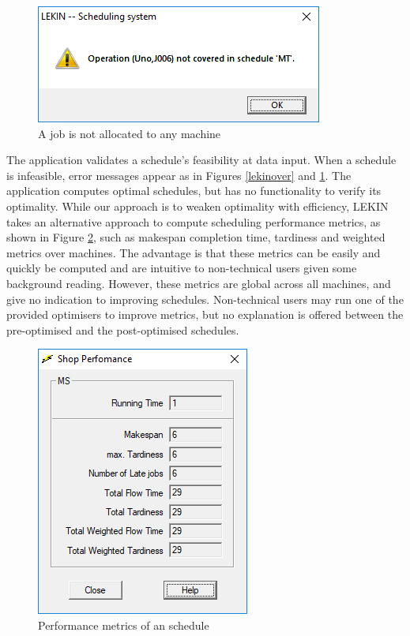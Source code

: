 \begin{figure}[H]
	\begin{center}
		\includegraphics[scale=0.8]{figures/lekin_unallocated.png}
	\end{center}
	\caption{A job is not allocated to any machine}
	\label{lekinunder}
\end{figure}

The application validates a schedule's feasibility at data input. When a schedule is infeasible, error messages appear as in Figures \ref{lekinover} and \ref{lekinunder}. The application computes optimal schedules, but has no functionality to verify its optimality. While our approach is to weaken optimality with efficiency, LEKIN takes an alternative approach to compute scheduling performance metrics, as shown in Figure \ref{lekinmetrics}, such as makespan completion time, tardiness and weighted metrics over machines. The advantage is that these metrics can be easily and quickly be computed and are intuitive to non-technical users given some background reading. However, these metrics are global across all machines, and give no indication to improving schedules. Non-technical users may run one of the provided optimisers to improve metrics, but no explanation is offered between the pre-optimised and the post-optimised schedules.

\begin{figure}[H]
	\begin{center}
		\includegraphics[scale=0.7]{figures/lekin_metric.png}
	\end{center}
	\caption{Performance metrics of an schedule}
	\label{lekinmetrics}
\end{figure}

